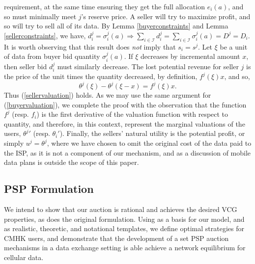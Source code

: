 \documentclass[12pt]{article}
\theoremstyle{definition}
\newcommand{\mcI}{\mathcal{I}}
\newcommand{\g}{\sigma}
\begin{document}
\begin{multicols}{2}
requirement, at the same time ensuring they get the full allocation $e_i(a)$,
and so must minimally meet $j$'s reserve price. 
A seller will try to maximize profit, 
and so will try to sell all of its data.  By Lemma
\ref{buyerconstraints} and Lemma \ref{sellerconstraints}, we have,
$d_i^j = \g_i^j(a) \Rightarrow \sum_{i\in{\mcI}} d_i^j =
\sum_{i\in\mcI} \g_i^j(a) = D^j = D_i$. It is worth observing that this result
does \emph{not} imply that $s_i=s^j$. Let $\xi$
be a unit of data from buyer bid quantity $\g_i^j(a)$.
If $\xi$ decreases by incremental amount $x$, then seller bid $d_i^j$ must
similarly decrease. The lost potential revenue for seller $j$ is the price of
the unit times the quantity decreased, by definition, $f^j(\xi)x$, and so,
$$
    \theta^j(\xi) - \theta^j(\xi-x) = f^j(\xi)x.
$$
Thus (\ref{sellervaluation}) holds.
As we may use the same argument for (\ref{buyervaluation}), we complete the
proof with the observation that the function $f^j$ (resp. $f_i$) is the first
derivative of the valuation function with respect to
quantity, and therefore, in this context, represent the marginal valuations of the
users, ${\theta^j}'$ (resp. $\theta_i'$). Finally, the sellers' natural utility is the potential
profit, or simply $u^j = \theta^j$, where we have chosen to omit the original cost of the data
paid to the ISP, as it is not a component of our mechanism, and as a discussion
of mobile data plans is outside the scope of this paper.  

\subsection{PSP Formulation}

We intend to show that our auction
is rational and achieves the desired VCG properties, as does the original
formulation. Using \cite{zheng} as a basis for our model, and \cite{lazar} as
realistic, theoretic, and notational templates, we define optimal strategies for
CMHK users, and demonstrate that the development of a set PSP auction mechanisms
in a data exchange setting is able achieve a network equilibrium for cellular data. 



\end{multicols}
\end{document}
